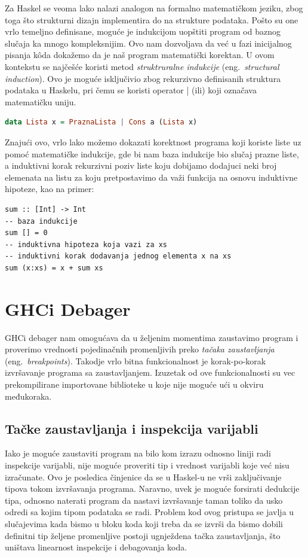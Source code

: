 \documentclass[a4paper]{article}
\begin{document}
{{Za Haskel se veoma lako nalazi analogon na formalno matematičkom jeziku, zbog toga što strukturni dizajn implementira do na strukture podataka. Pošto su one vrlo temeljno definisane, moguće je indukcijom uopštiti program od baznog slučaja ka mnogo kompleksnijim. Ovo nam dozvoljava da već u fazi inicijalnog pisanja k\^{o}da dokažemo da je naš program matematički korektan. U ovom kontekstu se najčešće koristi metod {\em struktruralne indukcije}  (eng.~{\em structural induction}). Ovo je moguće isključivio zbog rekurzivno definisanih struktura podataka u Haskelu, pri čemu se koristi operator | (ili) koji označava matematičku uniju.\cite{craftOfFuncProg}
\newpage
\begin{lstlisting}[language=Haskell,caption={Rekurzivno definisanje liste u Haskelu},frame=single, label=simple]
data Lista x = PraznaLista | Cons a (Lista x)
\end{lstlisting}
Znajući ovo, vrlo lako možemo dokazati korektnost programa koji koriste liste uz pomoć matematičke indukcije, gde bi nam baza indukcije bio slučaj prazne liste, a induktivni korak rekurzivni poziv liste koju dobijamo dodajuci neki broj elemenata na listu za koju pretpostavimo da važi funkcija na osnovu induktivne hipoteze, kao na primer:
\begin{lstlisting}[caption={Primer rekurzivno definisane funkcije},frame=single, label=simple]
sum :: [Int] -> Int
-- baza indukcije
sum [] = 0
-- induktivna hipoteza koja vazi za xs
-- induktivni korak dodavanja jednog elementa x na xs
sum (x:xs) = x + sum xs 
\end{lstlisting}


\section{GHCi Debager}
GHCi debager nam omogućava da u željenim momentima zaustavimo program i proverimo vrednosti pojedinačnih promenljivih preko {\em tačaka zaustavljanja} (eng.~{\em breakpoints}). Takodje vrlo bitna funkcionalnost je korak-po-korak izvršavanje programa sa zaustavljanjem. Izuzetak od ove funkcionalnosti su vec prekompilirane importovane biblioteke u koje nije moguće ući u okviru međukoraka.


\subsection{Tačke zaustavljanja i inspekcija varijabli}
Iako je moguće zaustaviti program na bilo kom izrazu odnosno liniji radi inspekcije varijabli, nije moguće proveriti tip i vrednost varijabli koje već nisu izračunate. Ovo je posledica činjenice da se u Haskel-u ne vrši zaključivanje tipova tokom izvršavanja programa. Naravno, uvek je moguće forsirati dedukcije tipa, odnosno naterati program da nastavi izvršavanje taman toliko da usko odredi sa kojim tipom podataka se radi. Problem kod ovog pristupa se javlja u slučajevima kada bismo u bloku koda koji treba da se izvrši da bismo dobili definitni tip željene promenljive postoji ugnježdena tačka zaustavljanja, što uništava linearnost inspekcije i debagovanja koda. 

}}
\end{document}
